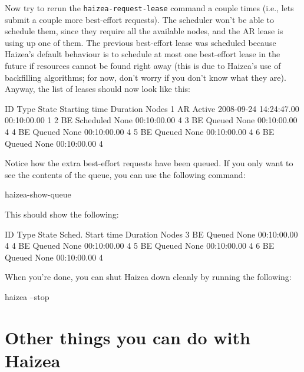 Now try to rerun the \texttt{haizea-request-lease} command a couple times (i.e., lets submit a couple more best-effort requests). The scheduler won't be able to schedule them, since they require all the available nodes, and the AR lease is using up one of them. The previous best-effort lease was scheduled because Haizea's default behaviour is to schedule at most one best-effort lease in the future if resources cannot be found right away (this is due to Haizea's use of backfilling algorithms; for now, don't worry if you don't know what they are). Anyway, the list of leases should now look like this:

\begin{wideshellverbatim}
 ID   Type  State      Starting time           Duration      Nodes  
 1    AR    Active     2008-09-24 14:24:47.00  00:10:00.00   1       
 2    BE    Scheduled  None                    00:10:00.00   4       
 3    BE    Queued     None                    00:10:00.00   4       
 4    BE    Queued     None                    00:10:00.00   4       
 5    BE    Queued     None                    00:10:00.00   4       
 6    BE    Queued     None                    00:10:00.00   4       
\end{wideshellverbatim}

Notice how the extra best-effort requests have been queued. If you only want to see the contents of the queue, you can use the following command:

\begin{shellverbatim}
haizea-show-queue
\end{shellverbatim}

This should show the following:

\begin{wideshellverbatim}
 ID   Type  State      Sched. Start time       Duration      Nodes  
 3    BE    Queued     None                    00:10:00.00   4       
 4    BE    Queued     None                    00:10:00.00   4       
 5    BE    Queued     None                    00:10:00.00   4       
 6    BE    Queued     None                    00:10:00.00   4       
\end{wideshellverbatim}

When you're done, you can shut Haizea down cleanly by running the following:

\begin{shellverbatim}
haizea --stop
\end{shellverbatim}


\section{Other things you can do with Haizea}

